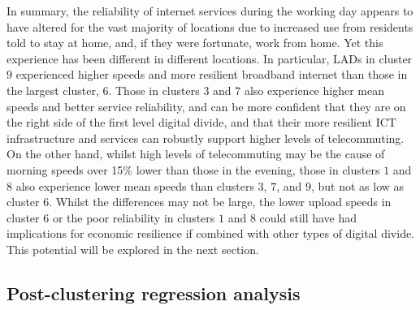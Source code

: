 \documentclass[]{interact}
\theoremstyle{plain}%
\theoremstyle{definition}
\theoremstyle{remark}
\begin{document}
In summary, the reliability of internet services during the working day
appears to have altered for the vast majority of locations due to
increased use from residents told to stay at home, and, if they were
fortunate, work from home. Yet this experience has been different in
different locations. In particular, LADs in cluster \(9\) experienced
higher speeds and more resilient broadband internet than those in the
largest cluster, \(6\). Those in clusters \(3\) and \(7\) also
experience higher mean speeds and better service reliability, and can be
more confident that they are on the right side of the first level
digital divide, and that their more resilient ICT infrastructure and
services can robustly support higher levels of telecommuting. On the
other hand, whilst high levels of telecommuting may be the cause of
morning speeds over 15\% lower than those in the evening, those in
clusters \(1\) and \(8\) also experience lower mean speeds than clusters
\(3\), \(7\), and \(9\), but not as low as cluster \(6\). Whilst the
differences may not be large, the lower upload speeds in cluster \(6\)
or the poor reliability in clusters \(1\) and \(8\) could still have had
implications for economic resilience if combined with other types of
digital divide. This potential will be explored in the next section.

\hypertarget{sec:4.2}{%
\subsection{Post-clustering regression analysis}\label{sec:4.2}}
\end{document}
